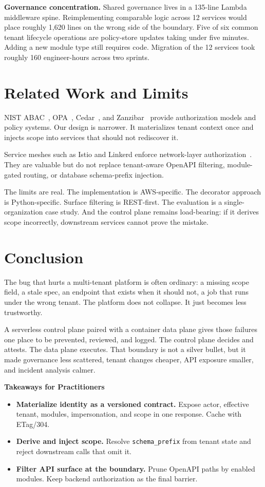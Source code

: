 \documentclass[10pt,journal]{IEEEtran}
\newcommand{\code}[1]{{\small\texttt{\textcolor{causifyblue}{#1}}}}
\begin{document}
\textbf{Governance concentration.} Shared governance lives in a 135-line Lambda middleware spine. Reimplementing comparable logic across 12 services would place roughly 1,620 lines on the wrong side of the boundary. Five of six common tenant lifecycle operations are policy-store updates taking under five minutes. Adding a new module type still requires code. Migration of the 12 services took roughly 160 engineer-hours across two sprints.

\section{Related Work and Limits}

NIST ABAC~\cite{nist_sp800162}, OPA~\cite{opa_docs}, Cedar~\cite{cedar_docs}, and Zanzibar~\cite{zanzibar} provide authorization models and policy systems. Our design is narrower. It materializes tenant context once and injects scope into services that should not rediscover it.

Service meshes such as Istio and Linkerd enforce network-layer authorization~\cite{istio_authz}. They are valuable but do not replace tenant-aware OpenAPI filtering, module-gated routing, or database schema-prefix injection.

The limits are real. The implementation is AWS-specific. The decorator approach is Python-specific. Surface filtering is REST-first. The evaluation is a single-organization case study. And the control plane remains load-bearing: if it derives scope incorrectly, downstream services cannot prove the mistake.

\section{Conclusion}

The bug that hurts a multi-tenant platform is often ordinary: a missing scope field, a stale spec, an endpoint that exists when it should not, a job that runs under the wrong tenant. The platform does not collapse. It just becomes less trustworthy.

A serverless control plane paired with a container data plane gives those failures one place to be prevented, reviewed, and logged. The control plane decides and attests. The data plane executes. That boundary is not a silver bullet, but it made governance less scattered, tenant changes cheaper, API exposure smaller, and incident analysis calmer.

\noindent\textbf{Takeaways for Practitioners}
\begin{itemize}[label=\textbullet, leftmargin=1.2em, topsep=2pt, itemsep=1pt, parsep=0pt]
  \item \textbf{Materialize identity as a versioned contract.} Expose actor, effective tenant, modules, impersonation, and scope in one response. Cache with ETag/304.
  \item \textbf{Derive and inject scope.} Resolve \code{schema\_prefix} from tenant state and reject downstream calls that omit it.
  \item \textbf{Filter API surface at the boundary.} Prune OpenAPI paths by enabled modules. Keep backend authorization as the final barrier.
\end{itemize}
\end{document}
